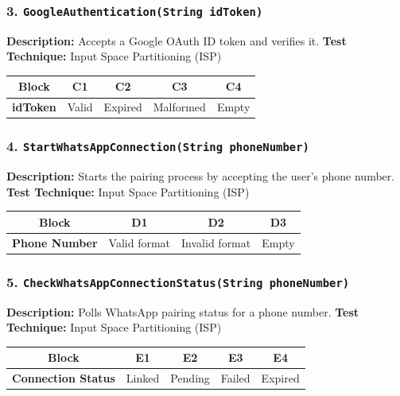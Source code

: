 \subsubsection*{3. \texttt{GoogleAuthentication(String idToken)}}

\textbf{Description:} Accepts a Google OAuth ID token and verifies it.  
\textbf{Test Technique:} Input Space Partitioning (ISP)

\begin{table}[h!]
\centering
\begin{tabular}{|c|c|c|c|c|}
\hline
\textbf{Block} & \textbf{C1} & \textbf{C2} & \textbf{C3} & \textbf{C4} \\
\hline
\textbf{idToken} & Valid & Expired & Malformed & Empty \\
\hline
\end{tabular}
\end{table}

\subsubsection*{4. \texttt{StartWhatsAppConnection(String phoneNumber)}}

\textbf{Description:} Starts the pairing process by accepting the user’s phone number.  
\textbf{Test Technique:} Input Space Partitioning (ISP)

\begin{table}[h!]
\centering
\begin{tabular}{|c|c|c|c|}
\hline
\textbf{Block} & \textbf{D1} & \textbf{D2} & \textbf{D3} \\
\hline
\textbf{Phone Number} & Valid format & Invalid format & Empty \\
\hline
\end{tabular}
\end{table}

\subsubsection*{5. \texttt{CheckWhatsAppConnectionStatus(String phoneNumber)}}

\textbf{Description:} Polls WhatsApp pairing status for a phone number.  
\textbf{Test Technique:} Input Space Partitioning (ISP)

\begin{table}[h!]
\centering
\begin{tabular}{|c|c|c|c|c|}
\hline
\textbf{Block} & \textbf{E1} & \textbf{E2} & \textbf{E3} & \textbf{E4} \\
\hline
\textbf{Connection Status} & Linked & Pending & Failed & Expired \\
\hline
\end{tabular}
\end{table}

